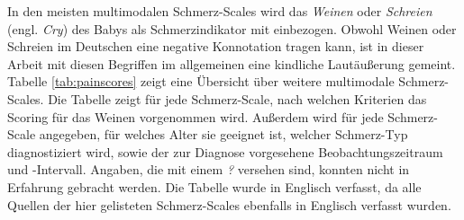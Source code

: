 In den meisten multimodalen Schmerz-Scales wird das \emph{Weinen} oder \emph{Schreien} (engl. \emph{Cry}) des Babys als Schmerzindikator mit einbezogen.\cite[S. 97 - 98]{painInNeonates} Obwohl Weinen oder Schreien im Deutschen eine negative Konnotation tragen kann, ist in dieser Arbeit mit diesen Begriffen im allgemeinen eine \glqq kindliche Lautäußerung\grqq{} gemeint. Tabelle \ref{tab:painscores} zeigt eine Übersicht über weitere multimodale Schmerz-Scales. Die Tabelle zeigt für jede Schmerz-Scale, nach welchen Kriterien das Scoring für das Weinen vorgenommen wird. Außerdem wird für jede Schmerz-Scale angegeben, für welches Alter sie geeignet ist, welcher Schmerz-Typ diagnostiziert wird, sowie der zur Diagnose vorgesehene Beobachtungszeitraum und -Intervall. Angaben, die mit einem \emph{?} versehen sind, konnten nicht in Erfahrung gebracht werden. Die Tabelle wurde in Englisch verfasst, da alle Quellen der hier gelisteten Schmerz-Scales ebenfalls in Englisch verfasst wurden.


